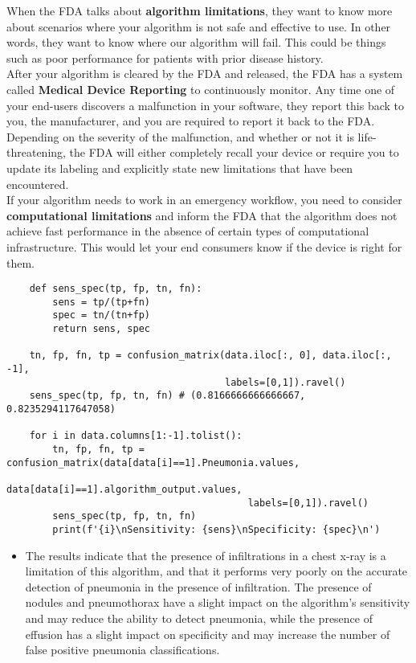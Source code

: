 \documentclass[11pt, a4paper]{article}
\begin{document}
	\noindent When the FDA talks about \textbf{algorithm limitations}, they want to know more about scenarios where your algorithm is not safe and effective to use. In other words, they want to know where our algorithm will fail. This could be things such as poor performance for patients with prior disease history. \vspace*{3mm}\\
	After your algorithm is cleared by the FDA and released, the FDA has a system called \textbf{Medical Device Reporting} to continuously monitor. Any time one of your end-users discovers a malfunction in your software, they report this back to you, the manufacturer, and you are required to report it back to the FDA. Depending on the severity of the malfunction, and whether or not it is life-threatening, the FDA will either completely recall your device or require you to update its labeling and explicitly state new limitations that have been encountered. \vspace*{3mm}\\
	If your algorithm needs to work in an emergency workflow, you need to consider \textbf{computational limitations} and inform the FDA that the algorithm does not achieve fast performance in the absence of certain types of computational infrastructure. This would let your end consumers know if the device is right for them. \vspace*{1mm}
	\begin{lstlisting}
	def sens_spec(tp, fp, tn, fn):
		sens = tp/(tp+fn)
		spec = tn/(tn+fp)
		return sens, spec
	
	tn, fp, fn, tp = confusion_matrix(data.iloc[:, 0], data.iloc[:, -1],
	                                  labels=[0,1]).ravel()
	sens_spec(tp, fp, tn, fn) # (0.8166666666666667, 0.8235294117647058)
	
	for i in data.columns[1:-1].tolist():
		tn, fp, fn, tp = confusion_matrix(data[data[i]==1].Pneumonia.values,
		                                  data[data[i]==1].algorithm_output.values,
		                                  labels=[0,1]).ravel()
		sens_spec(tp, fp, tn, fn)
		print(f'{i}\nSensitivity: {sens}\nSpecificity: {spec}\n') \end{lstlisting}
	\begin{itemize}
		\item The results indicate that the presence of infiltrations in a chest x-ray is a limitation of this algorithm, and that it performs very poorly on the accurate detection of pneumonia in the presence of infiltration. The presence of nodules and pneumothorax have a slight impact on the algorithm's sensitivity and may reduce the ability to detect pneumonia, while the presence of effusion has a slight impact on specificity and may increase the number of false positive pneumonia classifications.
	\end{itemize}
\end{document}
